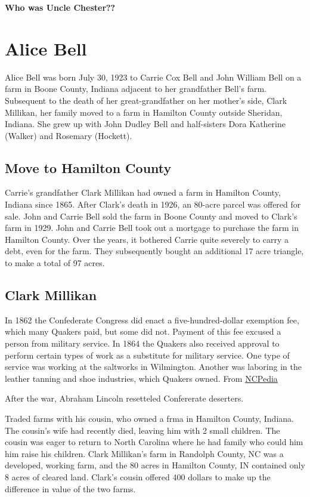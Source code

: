 \documentclass[
]{book}
\begin{document}
\textbf{Who was Uncle Chester??}

\hypertarget{alice-bell}{%
\chapter{Alice Bell}\label{alice-bell}}

Alice Bell was born July 30, 1923 to Carrie Cox Bell and John William Bell on a farm in Boone County, Indiana adjacent to her grandfather Bell's farm. Subsequent to the death of her great-grandfather on her mother's side, Clark Millikan, her family moved to a farm in Hamilton County outside Sheridan, Indiana. She grew up with John Dudley Bell and half-sisters Dora Katherine (Walker) and Rosemary (Hockett).

\hypertarget{move-to-hamilton-county}{%
\section{Move to Hamilton County}\label{move-to-hamilton-county}}

Carrie's grandfather Clark Millikan had owned a farm in Hamilton County, Indiana since 1865. After Clark's death in 1926, an 80-acre parcel was offered for sale. John and Carrie Bell sold the farm in Boone County and moved to Clark's farm in 1929. John and Carrie Bell took out a mortgage to purchase the farm in Hamilton County. Over the years, it bothered Carrie quite severely to carry a debt, even for the farm. They subsequently bought an additional 17 acre triangle, to make a total of 97 acres.

\hypertarget{clark-millikan-1}{%
\section{Clark Millikan}\label{clark-millikan-1}}

In 1862 the Confederate Congress did enact a five-hundred-dollar exemption fee, which many Quakers paid, but some did not. Payment of this fee excused a person from military service. In 1864 the Quakers also received approval to perform certain types of work as a substitute for military service. One type of service was working at the saltworks in Wilmington. Another was laboring in the leather tanning and shoe industries, which Quakers owned. From \href{https://www.ncpedia.org/quakers-and-their-war-resistance}{NCPedia}

After the war, Abraham Lincoln resetteled Confererate deserters.

Traded farms with his cousin, who owned a frma in Hamilton County, Indiana. The cousin's wife had recently died, leaving him with 2 small children. The cousin was eager to return to North Carolina where he had family who could him him raise his children. Clark Millikan's farm in Randolph County, NC was a developed, working farm, and the 80 acres in Hamilton County, IN contained only 8 acres of cleared land. Clark's cousin offered 400 dollars to make up the difference in value of the two farms.
\end{document}
